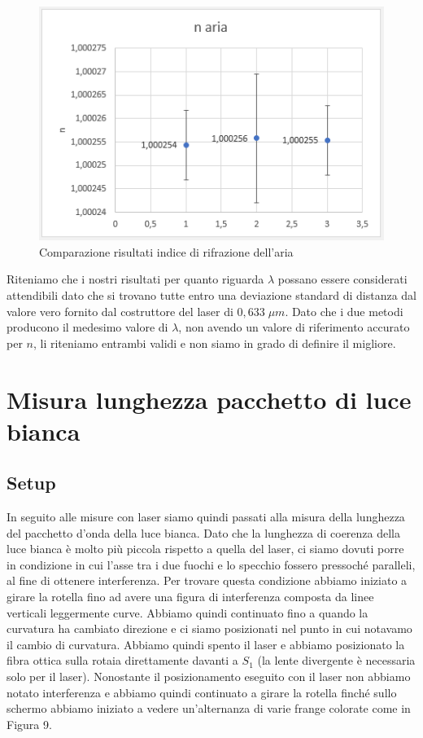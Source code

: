 \documentclass{article}
\begin{document}
\begin{figure}[h!]
  \centering
  \includegraphics[width=0.6\linewidth]{IM grafico risultati n}
  \caption{Comparazione risultati indice di rifrazione dell'aria}
\end{figure}


Riteniamo che i nostri risultati per quanto riguarda $\lambda$ possano essere considerati attendibili dato che si trovano tutte entro una deviazione standard di distanza dal valore vero fornito dal costruttore del laser di $0,633 \; \mu m$. Dato che i due metodi producono il medesimo valore di $\lambda$, non avendo un valore di riferimento accurato per $n$, li riteniamo entrambi validi e non siamo in grado di definire il migliore.



\section{Misura lunghezza pacchetto di luce bianca}

\subsection{Setup}
In seguito alle misure con laser siamo quindi passati alla misura della lunghezza del pacchetto d'onda della luce bianca. Dato che la lunghezza di coerenza della luce bianca è molto più piccola rispetto a quella del laser, ci siamo dovuti porre in condizione in cui l'asse tra i due fuochi e lo specchio fossero pressoché paralleli, al fine di ottenere interferenza. Per trovare questa condizione abbiamo iniziato a girare la rotella fino ad avere una figura di interferenza composta da linee verticali leggermente curve. Abbiamo quindi continuato fino a quando la curvatura ha cambiato direzione e ci siamo posizionati nel punto in cui notavamo il cambio di curvatura. Abbiamo quindi spento il laser e abbiamo posizionato la fibra ottica sulla rotaia direttamente davanti a $S_1$ (la lente divergente è necessaria solo per il laser). Nonostante il posizionamento eseguito con il laser non abbiamo notato interferenza e abbiamo quindi continuato a girare la rotella finché sullo schermo abbiamo iniziato a vedere un'alternanza di varie frange colorate come in Figura 9.
\end{document}
